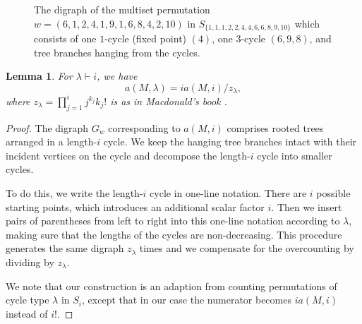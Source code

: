 \documentclass[letterpaper]{amsart}
\theoremstyle{plain}
\newtheorem{lemma}[theorem]{Lemma}
\theoremstyle{definition}
\theoremstyle{remark}
\begin{document}
\begin{figure}[h!]
\centering
\caption{The digraph of the multiset permutation $w=(6, 1, 2, 4, 1, 9, 1, 6, 8, 4, 2, 10)$ in $ S_{\{1, 1, 1, 2, 2, 4, 4, 6, 6, 8, 9, 10\}}$ which consists of one $1$-cycle (fixed point) $(4)$, one $3$-cycle $(6, 9, 8)$, and tree branches hanging from the cycles.}
\label{fig:figure1}
\end{figure}

\begin{lemma}\label{lm:partition}
For $\lambda\vdash i$, we have
\begin{equation*}
a(M,\lambda) = i a(M,i)/z_\lambda,
\end{equation*}
where $z_\lambda=\prod_{j=1}^i j^{k_j} k_j!$ is as in Macdonald's book \cite[page 24]{Macdonald1995}.
\end{lemma}

\begin{proof}
The digraph $G_w$ corresponding to $a(M,i)$ comprises rooted trees arranged in a length-$i$ cycle. We keep the hanging tree branches intact with their incident vertices on the cycle and decompose the length-$i$ cycle into smaller cycles.
 
To do this, we write the length-$i$ cycle in one-line notation. There are $i$ possible starting points, which introduces an additional scalar factor $i$. Then we insert pairs of parentheses from left to right into this one-line notation according to $\lambda$, making sure that the lengths of the cycles are non-decreasing. This procedure generates the same digraph $z_\lambda$ times and we compensate for the overcounting by dividing by $z_\lambda$.
 
We note that our construction is an adaption from counting permutations of cycle type $\lambda$ in $S_i$, except that in our case the numerator becomes $i a(M,i)$ instead of $i!$.
\end{proof}
\end{document}
